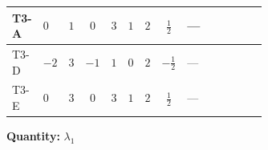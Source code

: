 \documentclass[8pt]{article}
\begin{document}
\begin{landscape}
\begin{longtable}{@{}llcccccc >{\raggedright\arraybackslash}p{0.21\linewidth} >{\raggedright\arraybackslash}p{0.21\linewidth} >{\raggedright\arraybackslash}p{0.21\linewidth}@{}}
\midrule
T3-A & $0$ & $1$ & $0$ & $3$ & $1$ & $2$ & $\frac{1}{2}$ & --- & \scriptsize\adjustbox{max width=\linewidth}{$\begin{gathered} +4 {\lambda_5} \left({\lambda_5}\right)^{*}\end{gathered}$} & \scriptsize\adjustbox{max width=\linewidth}{$\begin{gathered} +\frac{9 {g_2}^4}{4}\end{gathered}$} \\
\midrule
T3-D & $-2$ & $3$ & $-1$ & $1$ & $0$ & $2$ & $-\frac{1}{2}$ & --- & \scriptsize\adjustbox{max width=\linewidth}{$\begin{gathered} +4 {\lambda_5} \left({\lambda_5}\right)^{*}\end{gathered}$} & \scriptsize\adjustbox{max width=\linewidth}{$\begin{gathered} +\frac{9 {g_2}^4}{4}\end{gathered}$} \\
\midrule
T3-E & $0$ & $3$ & $0$ & $3$ & $1$ & $2$ & $\frac{1}{2}$ & --- & \scriptsize\adjustbox{max width=\linewidth}{$\begin{gathered} +4 {\lambda_5} \left({\lambda_5}\right)^{*}\end{gathered}$} & \scriptsize\adjustbox{max width=\linewidth}{$\begin{gathered} +\frac{9 {g_2}^4}{4}\end{gathered}$} \\
\midrule
\bottomrule
\end{longtable}
\clearpage
\noindent\textbf{Quantity: }$\lambda_1$\par\smallskip

\end{landscape}
\end{document}
